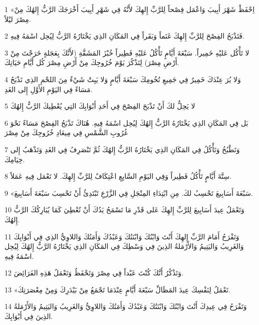 \par 1 «اِحْفَظْ شَهْرَ أَبِيبَ وَاعْمَل فِصْحاً لِلرَّبِّ إِلهِكَ لأَنَّهُ فِي شَهْرِ أَبِيبَ أَخْرَجَكَ الرَّبُّ إِلهُكَ مِنْ مِصْرَ ليْلاً.
\par 2 فَتَذْبَحُ الفِصْحَ لِلرَّبِّ إِلهِكَ غَنَماً وَبَقَراً فِي المَكَانِ الذِي يَخْتَارُهُ الرَّبُّ لِيُحِل اسْمَهُ فِيهِ.
\par 3 لا تَأْكُل عَليْهِ خَمِيراً. سَبْعَةَ أَيَّامٍ تَأْكُلُ عَليْهِ فَطِيراً خُبْزَ المَشَقَّةِ (لأَنَّكَ بِعَجَلةٍ خَرَجْتَ مِنْ أَرْضِ مِصْرَ) لِتَذْكُرَ يَوْمَ خُرُوجِكَ مِنْ أَرْضِ مِصْرَ كُل أَيَّامِ حَيَاتِكَ.
\par 4 وَلا يُرَ عِنْدَكَ خَمِيرٌ فِي جَمِيعِ تُخُومِكَ سَبْعَةَ أَيَّامٍ وَلا يَبِتْ شَيْءٌ مِنَ اللحْمِ الذِي تَذْبَحُ مَسَاءً فِي اليَوْمِ الأَوَّلِ إِلى الغَدِ.
\par 5 لا يَحِلُّ لكَ أَنْ تَذْبَحَ الفِصْحَ فِي أَحَدِ أَبْوَابِكَ التِي يُعْطِيكَ الرَّبُّ إِلهُكَ
\par 6 بَل فِي المَكَانِ الذِي يَخْتَارُهُ الرَّبُّ إِلهُكَ لِيُحِل اسْمَهُ فِيهِ. هُنَاكَ تَذْبَحُ الفِصْحَ مَسَاءً نَحْوَ غُرُوبِ الشَّمْسِ فِي مِيعَادِ خُرُوجِكَ مِنْ مِصْرَ
\par 7 وَتَطْبُخُ وَتَأْكُلُ فِي المَكَانِ الذِي يَخْتَارُهُ الرَّبُّ إِلهُكَ ثُمَّ تَنْصَرِفُ فِي الغَدِ وَتَذْهَبُ إِلى خِيَامِكَ.
\par 8 سِتَّةَ أَيَّامٍ تَأْكُلُ فَطِيراً وَفِي اليَوْمِ السَّابِعِ اعْتِكَافٌ لِلرَّبِّ إِلهِكَ. لا تَعْمَل فِيهِ عَمَلاً.
\par 9 «سَبْعَةَ أَسَابِيعَ تَحْسِبُ لكَ. مِنِ ابْتِدَاءِ المِنْجَلِ فِي الزَّرْعِ تَبْتَدِئُ أَنْ تَحْسِبَ سَبْعَةَ أَسَابِيعَ.
\par 10 وَتَعْمَلُ عِيدَ أَسَابِيعَ لِلرَّبِّ إِلهِكَ عَلى قَدْرِ مَا تَسْمَحُ يَدُكَ أَنْ تُعْطِيَ كَمَا يُبَارِكُكَ الرَّبُّ إِلهُكَ.
\par 11 وَتَفْرَحُ أَمَامَ الرَّبِّ إِلهِكَ أَنْتَ وَابْنُكَ وَابْنَتُكَ وَعَبْدُكَ وَأَمَتُكَ وَاللاوِيُّ الذِي فِي أَبْوَابِكَ وَالغَرِيبُ وَاليَتِيمُ وَالأَرْمَلةُ الذِينَ فِي وَسْطِكَ فِي المَكَانِ الذِي يَخْتَارُهُ الرَّبُّ إِلهُكَ لِيُحِل اسْمَهُ فِيهِ.
\par 12 وَتَذْكُرُ أَنَّكَ كُنْتَ عَبْداً فِي مِصْرَ وَتَحْفَظُ وَتَعْمَلُ هَذِهِ الفَرَائِضَ.
\par 13 «تَعْمَلُ لِنَفْسِكَ عِيدَ المَظَالِّ سَبْعَةَ أَيَّامٍ عِنْدَمَا تَجْمَعُ مِنْ بَيْدَرِكَ وَمِنْ مِعْصَرَتِكَ.
\par 14 وَتَفْرَحُ فِي عِيدِكَ أَنْتَ وَابْنُكَ وَابْنَتُكَ وَعَبْدُكَ وَأَمَتُكَ وَاللاوِيُّ وَالغَرِيبُ وَاليَتِيمُ وَالأَرْمَلةُ الذِينَ فِي أَبْوَابِكَ.
